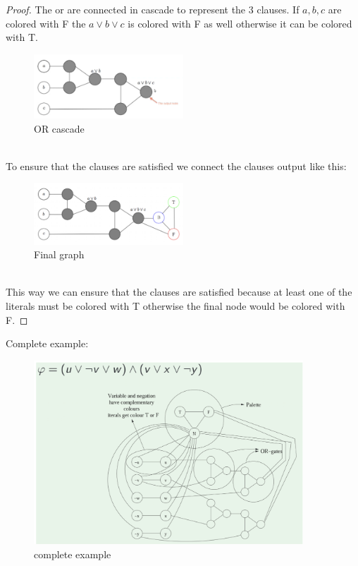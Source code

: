 \documentclass[12pt]{article}
\begin{document}
\begin{proof}
The or are connected in cascade to represent the 3 clauses. If $a,b,c$ are colored with F the $a\vee b\vee c$ is colored with F as well otherwise it can be colored with T. 
\begin{figure}[ht]
  \centering
  \includegraphics[width=0.5\textwidth]{img/3-coloring-3g.png}
  \caption{OR cascade}
\end{figure}
\\
To ensure that the clauses are satisfied we connect the clauses output like this:
\\
\begin{figure}[ht]
  \centering
  \includegraphics[width=0.5\textwidth]{img/3-coloring-4g.png}
  \caption{Final graph}
\end{figure}
\\
This way we can ensure that the clauses are satisfied because at least one of the literals must be colored with T otherwise the final node would be colored with F.
\end{proof}
Complete example:\\
\begin{figure}[ht]
  \centering
  \includegraphics[width=0.9\textwidth]{img/3-coloring-example.png}
  \caption{complete example}
\end{figure}
\end{document}
